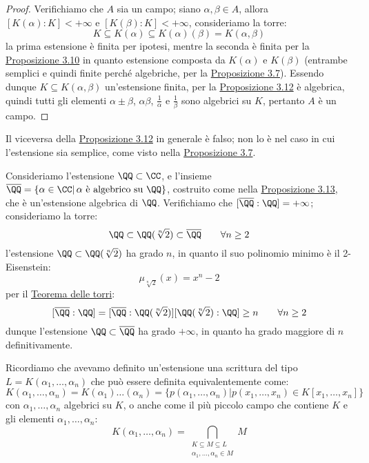 \documentclass[11pt]{scrartcl}
\begin{document}
\begin{proof}
    Verifichiamo che $A$ sia un campo; siano $\alpha,\beta \in A$, allora $[K(\alpha):K] <+\infty$ e $[K(\beta):K]<+\infty$, consideriamo la torre:
    \[ K \subseteq K(\alpha) \subseteq K(\alpha)(\beta) = K(\alpha,\beta)
        \]
    la prima estensione è finita per ipotesi, mentre la seconda è finita per la \hyperref[3.10]{Proposizione 3.10} in quanto estensione composta da $K(\alpha)$ e $K(\beta)$ (entrambe semplici e quindi finite perché algebriche, per la \hyperref[3.7]{Proposizione 3.7}).
    Essendo dunque $K \subseteq K(\alpha,\beta)$ un'estensione finita, per la \hyperref[3.12]{Proposizione 3.12}
    è algebrica, quindi tutti gli elementi $\alpha\pm\beta$, $\alpha\beta$, $\displaystyle\frac{1}{\alpha}$ e $\displaystyle\frac{1}{\beta}$ sono algebrici su $K$, pertanto $A$ è un campo.
\end{proof}

\begin{remark}
    Il viceversa della \hyperref[3.12]{Proposizione 3.12} in generale è falso; non lo è nel caso in cui l'estensione sia semplice, come visto nella \hyperref[3.7]{Proposizione 3.7}.
\end{remark}

\begin{example}
    Consideriamo l'estensione $\QQ \subset \CC$, e l'insieme $\overline\QQ = \{\alpha \in \CC | \, \text{$\alpha$ è algebrico su $\QQ$}\}$, costruito come nella \hyperref[3.13]{Proposizione 3.13},
    che è un'estensione algebrica di $\QQ$. Verifichiamo che $[\overline\QQ:\QQ] = +\infty$; consideriamo la torre:
    \[ \QQ \subset \QQ(\sqrt[n]{2}) \subset \overline \QQ \qquad \forall n \geq 2
        \]
    l'estensione $\QQ \subset \QQ(\sqrt[n]{2})$ ha grado $n$, in quanto il suo polinomio minimo è il 2-Eisenstein:
    \[ \mu_{\sqrt[n]{2}}(x) = x^n - 2
        \]
    per il \hyperref[torri]{Teorema delle torri}:
    \[ [\overline \QQ: \QQ] = [\overline \QQ: \QQ(\sqrt[n]{2})] [\QQ(\sqrt[n]{2}) : \QQ] \geq n \qquad \forall n \geq 2
        \]
    dunque l'estensione $\QQ \subset \overline\QQ$ ha grado $+\infty$, in quanto ha grado maggiore di $n$ definitivamente.
\end{example}

\pagebreak

\begin{remark}
    Ricordiamo che avevamo definito un'estensione  una scrittura del tipo $L = K(\alpha_1,\ldots,\alpha_n)$ che può essere definita equivalentemente come:
    \[ K(\alpha_1,\ldots,\alpha_n) = K(\alpha_1)\ldots(\alpha_n) = \{p(\alpha_1,\ldots,\alpha_n) | p(x_1,\ldots,x_n) \in K[x_1,\ldots,x_n] \}
        \]
    con $\alpha_1,\ldots,\alpha_n$ algebrici su $K$, o anche come il più piccolo campo che contiene $K$ e gli elementi $\alpha_1,\ldots,\alpha_n$:
    \[ K(\alpha_1,\ldots,\alpha_n) = \bigcap_{\substack{K \subseteq M \subseteq L \\ \alpha_1,\ldots,\alpha_n \in M}}M
        \]
\end{remark}
\end{document}
